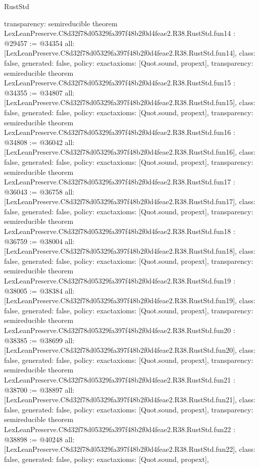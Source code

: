 \begin{lexlean}{RustStd}
\begin{coremodule}
{  transparency: semireducible
}
theorem LexLeanPreserve.C8d32f78d05329fa397f48b2f0d4feae2.R38.RustStd.fun14 : @29457 := @34354 {
  all: [LexLeanPreserve.C8d32f78d05329fa397f48b2f0d4feae2.R38.RustStd.fun14],
  class: false,
  generated: false,
  policy: exact{axioms: [Quot.sound, propext]},
  transparency: semireducible
}
theorem LexLeanPreserve.C8d32f78d05329fa397f48b2f0d4feae2.R38.RustStd.fun15 : @34355 := @34807 {
  all: [LexLeanPreserve.C8d32f78d05329fa397f48b2f0d4feae2.R38.RustStd.fun15],
  class: false,
  generated: false,
  policy: exact{axioms: [Quot.sound, propext]},
  transparency: semireducible
}
theorem LexLeanPreserve.C8d32f78d05329fa397f48b2f0d4feae2.R38.RustStd.fun16 : @34808 := @36042 {
  all: [LexLeanPreserve.C8d32f78d05329fa397f48b2f0d4feae2.R38.RustStd.fun16],
  class: false,
  generated: false,
  policy: exact{axioms: [Quot.sound, propext]},
  transparency: semireducible
}
theorem LexLeanPreserve.C8d32f78d05329fa397f48b2f0d4feae2.R38.RustStd.fun17 : @36043 := @36758 {
  all: [LexLeanPreserve.C8d32f78d05329fa397f48b2f0d4feae2.R38.RustStd.fun17],
  class: false,
  generated: false,
  policy: exact{axioms: [Quot.sound, propext]},
  transparency: semireducible
}
theorem LexLeanPreserve.C8d32f78d05329fa397f48b2f0d4feae2.R38.RustStd.fun18 : @36759 := @38004 {
  all: [LexLeanPreserve.C8d32f78d05329fa397f48b2f0d4feae2.R38.RustStd.fun18],
  class: false,
  generated: false,
  policy: exact{axioms: [Quot.sound, propext]},
  transparency: semireducible
}
theorem LexLeanPreserve.C8d32f78d05329fa397f48b2f0d4feae2.R38.RustStd.fun19 : @38005 := @38384 {
  all: [LexLeanPreserve.C8d32f78d05329fa397f48b2f0d4feae2.R38.RustStd.fun19],
  class: false,
  generated: false,
  policy: exact{axioms: [Quot.sound, propext]},
  transparency: semireducible
}
theorem LexLeanPreserve.C8d32f78d05329fa397f48b2f0d4feae2.R38.RustStd.fun20 : @38385 := @38699 {
  all: [LexLeanPreserve.C8d32f78d05329fa397f48b2f0d4feae2.R38.RustStd.fun20],
  class: false,
  generated: false,
  policy: exact{axioms: [Quot.sound, propext]},
  transparency: semireducible
}
theorem LexLeanPreserve.C8d32f78d05329fa397f48b2f0d4feae2.R38.RustStd.fun21 : @38700 := @38897 {
  all: [LexLeanPreserve.C8d32f78d05329fa397f48b2f0d4feae2.R38.RustStd.fun21],
  class: false,
  generated: false,
  policy: exact{axioms: [Quot.sound, propext]},
  transparency: semireducible
}
theorem LexLeanPreserve.C8d32f78d05329fa397f48b2f0d4feae2.R38.RustStd.fun22 : @38898 := @40248 {
  all: [LexLeanPreserve.C8d32f78d05329fa397f48b2f0d4feae2.R38.RustStd.fun22],
  class: false,
  generated: false,
  policy: exact{axioms: [Quot.sound, propext]},
}
\end{coremodule}
\end{lexlean}

